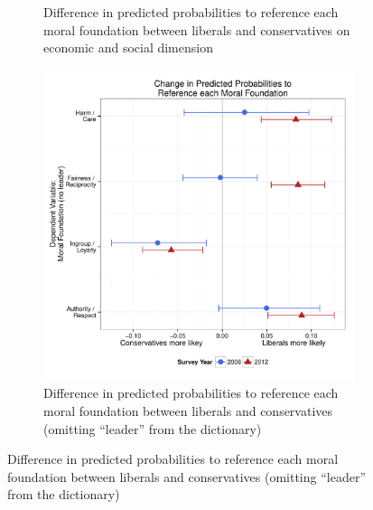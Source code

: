 \documentclass[12pt]{article}
\begin{document}
\begin{figure}[ht]
\begin{subfigure}[t]{0.49\textwidth}
    \caption{Difference in predicted probabilities to reference each moral foundation between liberals and conservatives on economic and social dimension}\label{fig:appD2soceco}
  \end{subfigure}
  \begin{subfigure}[t]{0.49\textwidth}
    \includegraphics[scale=.35]{../calc/fig/appD3lead.pdf}
    \caption{Difference in predicted probabilities to reference each moral foundation between liberals and conservatives (omitting ``leader'' from the dictionary)}\label{fig:appD3lead}
  \end{subfigure}
\end{figure}
\end{document}
